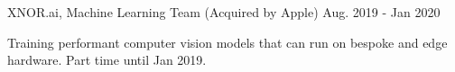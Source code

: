 \begin{cventries}
  \vspace{-0.4em}
  \cventry
    {XNOR.ai, Machine Learning Team (Acquired by Apple)}
    {}
    {}
    {Aug. 2019 - Jan 2020}
    {
      \begin{cvitems}
        \item {Training performant computer vision models that can run on bespoke and edge hardware. Part time until Jan 2019.}
	\vspace{-1em}
      \end{cvitems}
    }

\end{cventries}
